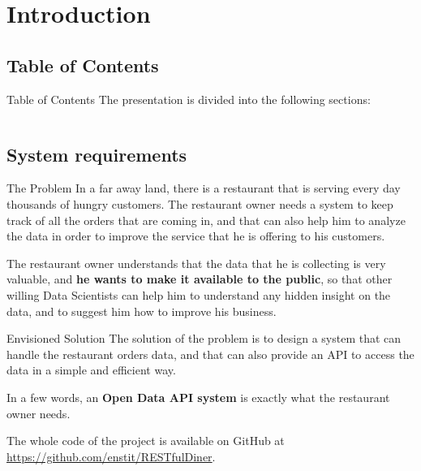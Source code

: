 

\section[Introduction]{Introduction}

\subsection{Table of Contents}

\begin{frame}{Table of Contents}
	The presentation is divided into the following sections:
	\begin{columns}[t]
        \begin{column}{.5\textwidth}
            \tableofcontents[sections={1-2}]
        \end{column}
        \begin{column}{.5\textwidth}
            \tableofcontents[sections={3-5}]
        \end{column}
    \end{columns}
\end{frame}

\subsection{System requirements}

\begin{frame}{The Problem}
	In a far away land, there is a restaurant that is serving every day
	thousands of hungry customers. The restaurant owner needs a system to keep
	track of all the orders that are coming in, and that can also help him to
	analyze the data in order to improve the service that he is offering to his
	customers.

	The restaurant owner understands that the data that he is collecting is very
	valuable, and \textbf{he wants to make it available to the public}, so that
	other willing Data Scientists can help him to understand any hidden insight
	on the data, and to suggest him how to improve his business.
\end{frame}

\begin{frame}{Envisioned Solution}
	The solution of the problem is to design a system that can handle the
	restaurant orders data, and that can also provide an API to access the data
	in a simple and efficient way.

	In a few words, an \textbf{Open Data API system} is exactly what the
	restaurant owner needs.

	The whole code of the project is available on GitHub at
	\url{https://github.com/enstit/RESTfulDiner}.
\end{frame}
